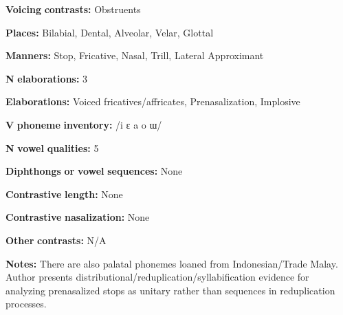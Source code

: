 \begin{styleBody}
\textbf{Voicing} \textbf{contrasts:} Obstruents
\end{styleBody}

\begin{styleBody}
\textbf{Places:} Bilabial, Dental, Alveolar, Velar, Glottal
\end{styleBody}

\begin{styleBody}
\textbf{Manners:} Stop, Fricative, Nasal, Trill, Lateral Approximant
\end{styleBody}

\begin{styleBody}
\textbf{N} \textbf{elaborations:} 3
\end{styleBody}

\begin{styleBody}
\textbf{Elaborations:} Voiced fricatives/affricates, Prenasalization, Implosive
\end{styleBody}

\begin{styleBody}
\textbf{V} \textbf{phoneme} \textbf{inventory:} /i ɛ a o ɯ/
\end{styleBody}

\begin{styleBody}
\textbf{N} \textbf{vowel} \textbf{qualities:} 5
\end{styleBody}

\begin{styleBody}
\textbf{Diphthongs} \textbf{or} \textbf{vowel} \textbf{sequences:} None
\end{styleBody}

\begin{styleBody}
\textbf{Contrastive} \textbf{length:} None
\end{styleBody}

\begin{styleBody}
\textbf{Contrastive} \textbf{nasalization:} None
\end{styleBody}

\begin{styleBody}
\textbf{Other} \textbf{contrasts:} N/A
\end{styleBody}

\begin{styleBody}
\textbf{Notes:} There are also palatal phonemes loaned from Indonesian/Trade Malay. Author presents distributional/reduplication/syllabification evidence for analyzing prenasalized stops as unitary rather than sequences in reduplication processes.
\end{styleBody}

